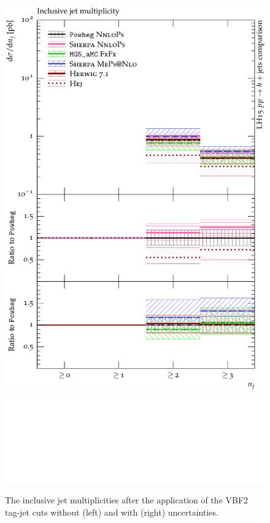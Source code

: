 \begin{figure}[t!]
\begin{minipage}{0.47\textwidth}
    \includegraphics[width=\textwidth]{figures/hjetscomp_NJet_incl_30_VBF2.pdf}\\
    \includegraphics[width=\textwidth]{figures/ratiopanelplaceholder.pdf}
  \end{minipage}
  \caption{
    The inclusive jet multiplicities after the application of the VBF2 
    tag-jet cuts without (left) and with (right) uncertainties. 
    \label{fig:hjetscomp:results:inclobs:njets_VBF2}
  }
\end{figure}


